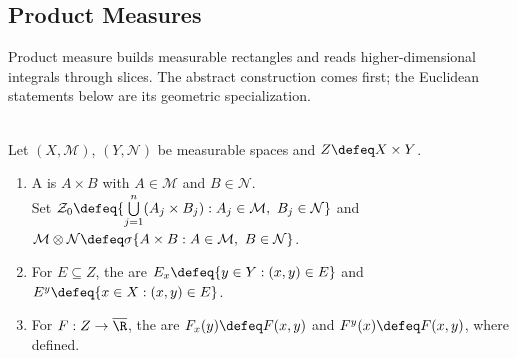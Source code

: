 \subsection{Product Measures}

%

Product measure builds measurable rectangles and reads higher-dimensional integrals through slices. The abstract construction comes first; the Euclidean statements below are its geometric specialization.

\begin{definition} \label{def:abstract-product-sigma-algebra-and-sections} \\
Let $(X,\mathcal{M})$, $(Y,\mathcal{N})$ be measurable spaces and $Z\defeq X\times Y$.
\begin{enumerate}[label=(\roman*)]
\setlength{\itemsep}{0pt}
\item A  is $A\times B$ with $A\in\mathcal{M}$ and $B\in\mathcal{N}$.\\
Set $\mathcal{Z}_0\defeq\{\bigcup\limits_{j=1}^n(A_j\times B_j):A_j\in\mathcal{M},\ B_j\in\mathcal{N}\}$ and $\mathcal{M}\otimes\mathcal{N}\defeq\sigma\{A\times B:A\in\mathcal{M},\ B\in\mathcal{N}\}$.
\item For $E\subseteq Z$, the  are $E_x\defeq\{y\in Y:(x,y)\in E\}$ and $E^y\defeq\{x\in X:(x,y)\in E\}$.
\item For $F:Z\to\overline{\R}$, the  are $F_x(y)\defeq F(x,y)$ and $F^y(x)\defeq F(x,y)$, where defined.
\end{enumerate}
\end{definition}

